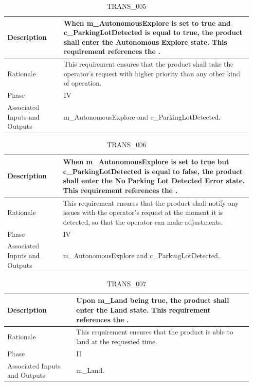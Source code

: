 \documentclass{article}
\begin{document}
\begin{table}[!h]
\begin{center}
\caption {TRANS\_005} 
\label{TRANS_007}
\begin{tabular}{ | m{3cm} | m{11cm} | }
\hline
Description & When m\_AutonomousExplore is set to true and c\_ParkingLotDetected is equal to true, the product shall enter the Autonomous Explore state. This requirement references the \nameref{Autonomous Explore State}. \\
\hline
Rationale & This requirement ensures that the product shall take the operator's request with higher priority than any other kind of operation. \\
\hline
Phase & IV \\
\hline
Associated Inputs and Outputs & m\_AutonomousExplore and c\_ParkingLotDetected. \\
\hline
\end{tabular}
\end{center}
\end{table}

\begin{table}[!h]
\begin{center}
\caption {TRANS\_006} 
\label{TRANS_008}
\begin{tabular}{ | m{3cm} | m{11cm} | }
\hline
Description & When m\_AutonomousExplore is set to true but c\_ParkingLotDetected is equal to false, the product shall enter the No Parking Lot Detected Error state. This requirement references the \nameref{No Parking Lot Detected Error State}. \\
\hline
Rationale & This requirement ensures that the product shall notify any issues with the operator's request at the moment it is detected, so that the operator can make adjustments. \\
\hline
Phase & IV \\
\hline
Associated Inputs and Outputs & m\_AutonomousExplore and c\_ParkingLotDetected. \\
\hline
\end{tabular}
\end{center}
\end{table}

\begin{table}[!h]
\begin{center}
\caption {TRANS\_007} 
\label{TRANS_009}
\begin{tabular}{ | m{3cm} | m{11cm} | }
\hline
Description & Upon m\_Land being true, the product shall enter the Land state. This requirement references the \nameref{Land State}. \\
\hline
Rationale & This requirement ensures that the product is able to land at the requested time. \\
\hline
Phase & II \\
\hline
Associated Inputs and Outputs & m\_Land. \\
\hline
\end{tabular}
\end{center}
\end{table}
\end{document}
